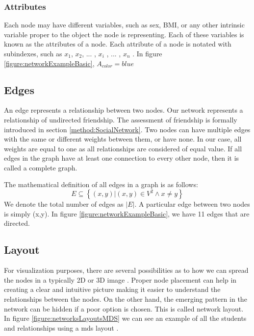 \subsubsection{Attributes}

Each node may have different variables, such as sex, BMI, or any other intrinsic variable proper to the object the node is representing. Each of these variables is known as the attributes of a node. Each attribute of a node is notated with subindexes, such as $x_1$, $x_2$, ... , $x_i$ , ... , $x_n$ . In figure \ref{figure:networkExampleBasic}, $A_{color} = blue$

\subsection{Edges}

An edge represents a relationship between two nodes. Our network represents a relationship of undirected friendship. The assessment of friendship is formally introduced in section \ref{method:SocialNetwork}. Two nodes can have multiple edges with the same or different weights between them, or have none. In our case, all weights are equal to one as all relationships are considered of equal value. If all edges in the graph have at least one connection to every other node, then it is called a complete graph.

The mathematical definition of all edges in a graph is as follows:
    \begin{equation}
        E \subseteq  \left\{   (x,y) | (x,y) \in V^2  \land x  \neq y  \right\}
    \end{equation}
We denote the total number of edges as $|E|$. A particular edge between two nodes is simply (x,y). In figure \ref{figure:networkExampleBasic}, we have 11 edges that are directed.

\subsection{Layout}
\label{background:layout}

For visualization purposes, there are several possibilities as to how we can spread the nodes in a typically 2D or 3D image \cite{Fruchterman1991, Kamada1989, osti_1145621, gabor2023, Buja2008}. Proper node placement can help in creating a clear and intuitive picture making it easier to understand the relationships between the nodes. On the other hand, the emerging pattern in the network can be hidden if a poor option is chosen. This is called network layout. In figure \ref{figure:networksLayoutsMDS} we can see an example of all the students and relationships using a \gls{mds} layout \cite{Buja2008}.

